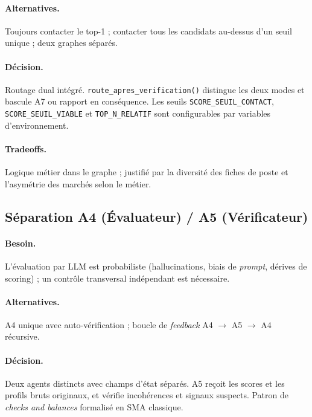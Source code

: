 \paragraph{Alternatives.} Toujours contacter le top-1 ; contacter tous les candidats au-dessus d'un seuil unique ; deux graphes séparés.

\paragraph{Décision.} Routage dual intégré. \texttt{route\_apres\_verification()} distingue les deux modes et bascule A7 ou rapport en conséquence. Les seuils \texttt{SCORE\_SEUIL\_CONTACT}, \texttt{SCORE\_SEUIL\_VIABLE} et \texttt{TOP\_N\_RELATIF} sont configurables par variables d'environnement.

\paragraph{Tradeoffs.} Logique métier dans le graphe ; justifié par la diversité des fiches de poste et l'asymétrie des marchés selon le métier.

\subsection{Séparation A4 (Évaluateur) / A5 (Vérificateur)}

\paragraph{Besoin.} L'évaluation par LLM est probabiliste (hallucinations, biais de \textit{prompt}, dérives de scoring) ; un contrôle transversal indépendant est nécessaire.

\paragraph{Alternatives.} A4 unique avec auto-vérification ; boucle de \textit{feedback} A4 \(\rightarrow\) A5 \(\rightarrow\) A4 récursive.

\paragraph{Décision.} Deux agents distincts avec champs d'état séparés. A5 reçoit les scores et les profils bruts originaux, et vérifie incohérences et signaux suspects. Patron de \textit{checks and balances} formalisé en SMA classique.

